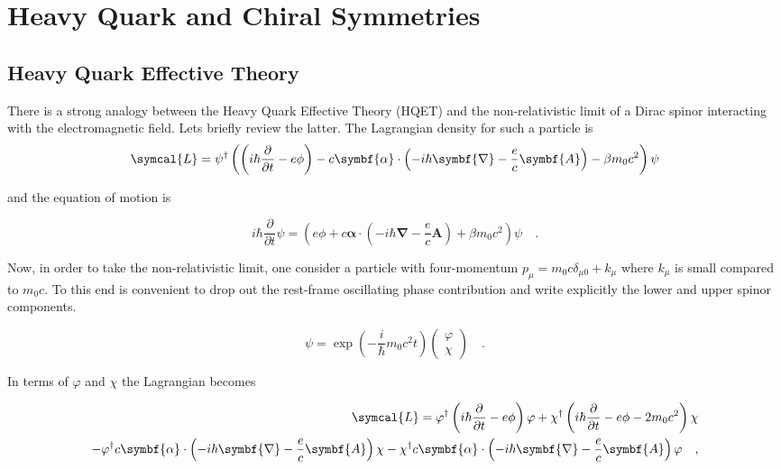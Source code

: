 \chapter{Heavy Quark and Chiral Symmetries}

\section{Heavy Quark Effective Theory}

There is a strong analogy between the Heavy Quark Effective Theory (HQET) and the non-relativistic limit of a Dirac spinor interacting with the electromagnetic field. Lets briefly review the latter. The Lagrangian density for such a particle is
\begin{equation}
  \symcal{L} = \psi^\dagger \left( \left(i \hbar \frac{\partial}{\partial t} - e \phi \right) - c \symbf{\alpha} \cdot \left(-i \hbar \symbf{\nabla} - \frac{e}{c} \symbf{A} \right) - \beta m_0 c^2 \right) \psi
\end{equation}

and the equation of motion is

\begin{equation}
  i \hbar \frac{\partial}{\partial t} \psi = \left( e \phi + c \symbf{\alpha} \cdot \left(-i \hbar \symbf{\nabla} - \frac{e}{c} \symbf{A} \right) + \beta m_0 c^2 \right) \psi \quad .
\end{equation}

Now, in order to take the non-relativistic limit, one consider a particle with four-momentum $p_\mu = m_0 c \delta_{\mu 0} + k_\mu$ where $k_\mu$ is small compared to $m_0 c$. To this end is convenient to drop out the rest-frame oscillating phase contribution and write explicitly the lower and upper spinor components.

\begin{equation}
  \psi = \exp \left( - \frac{i}{\hbar} m_0 c^2 t \right) \begin{pmatrix} \varphi \\ \chi \end{pmatrix} \quad .
\end{equation}

In terms of $\varphi$ and $\chi$ the Lagrangian becomes

\begin{equation}
\begin{split}
  \symcal{L} = \varphi^\dagger \left(i \hbar \frac{\partial}{\partial t} - e \phi \right) \varphi + \chi^\dagger \left(i \hbar \frac{\partial}{\partial t} - e \phi - 2 m_0 c^2 \right) \chi \\ - \varphi^\dagger c \symbf{\alpha} \cdot \left(-i \hbar \symbf{\nabla} - \frac{e}{c} \symbf{A} \right) \chi - \chi^\dagger c \symbf{\alpha} \cdot \left(- i \hbar \symbf{\nabla} - \frac{e}{c} \symbf{A} \right) \varphi \quad ,
\end{split}
\end{equation}

